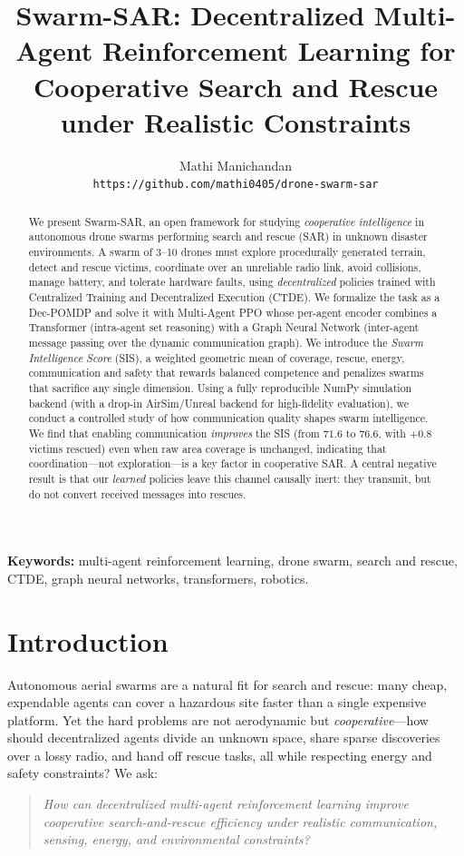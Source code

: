 \documentclass[twocolumn,10pt]{article}
\title{\vspace{-2em}\textbf{Swarm-SAR: Decentralized Multi-Agent Reinforcement Learning for\\ Cooperative Search and Rescue under Realistic Constraints}}
\author{Mathi Manichandan\\ \small \texttt{https://github.com/mathi0405/drone-swarm-sar}}
\date{}
\begin{document}
\maketitle
\begin{abstract}
We present Swarm-SAR, an open framework for studying \emph{cooperative
intelligence} in autonomous drone swarms performing search and rescue (SAR) in
unknown disaster environments. A swarm of 3--10 drones must explore procedurally
generated terrain, detect and rescue victims, coordinate over an unreliable radio
link, avoid collisions, manage battery, and tolerate hardware faults, using
\emph{decentralized} policies trained with Centralized Training and Decentralized
Execution (CTDE). We formalize the task as a Dec-POMDP and solve it with
Multi-Agent PPO whose per-agent encoder combines a Transformer (intra-agent set
reasoning) with a Graph Neural Network (inter-agent message passing over the
dynamic communication graph). We introduce the \emph{Swarm Intelligence Score}
(SIS), a weighted geometric mean of coverage, rescue, energy, communication and
safety that rewards balanced competence and penalizes swarms that sacrifice any
single dimension. Using a fully reproducible NumPy simulation backend (with a
drop-in AirSim/Unreal backend for high-fidelity evaluation), we conduct a
controlled study of how communication quality shapes swarm intelligence. We find
that enabling communication \emph{improves} the SIS (from $71.6$ to $76.6$, with
$+0.8$ victims rescued) even when raw area coverage is unchanged, indicating that
coordination---not exploration---is a key factor in cooperative SAR. A central
negative result is that our \emph{learned} policies leave this channel causally
inert: they transmit, but do not convert received messages into rescues.
\end{abstract}
\noindent\textbf{Keywords:} multi-agent reinforcement learning, drone swarm, search and rescue, CTDE,
graph neural networks, transformers, robotics.
\vspace{0.5em}

\section{Introduction}
Autonomous aerial swarms are a natural fit for search and rescue: many cheap,
expendable agents can cover a hazardous site faster than a single expensive
platform. Yet the hard problems are not aerodynamic but \emph{cooperative}---how
should decentralized agents divide an unknown space, share sparse discoveries over
a lossy radio, and hand off rescue tasks, all while respecting energy and safety
constraints? We ask:
\begin{quote}
\emph{How can decentralized multi-agent reinforcement learning improve cooperative
search-and-rescue efficiency under realistic communication, sensing, energy, and
environmental constraints?}
\end{quote}
\end{document}
